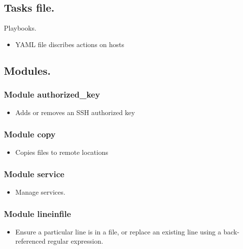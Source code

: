 \documentclass[16pt]{beamer}
\begin{document}
\subsection{Tasks file.}
\begin{frame}{Playbooks.}
  \begin{itemize}
  \item
  YAML file discribes actions on hosts
  \end{itemize}
  
\end{frame}


\subsection{Modules.}

\begin{frame}[fragile]
\frametitle{Module authorized\_key}
  \begin{itemize}
  \item
  Adds or removes an SSH authorized key
  \end{itemize}
  
\end{frame}

\begin{frame}[fragile]
\frametitle{Module copy}
  \begin{itemize}
  \item
  Copies files to remote locations
  \end{itemize}
  
\end{frame}


\begin{frame}[fragile]
\frametitle{Module service}
  \begin{itemize}
  \item
  Manage services.
  \end{itemize}
  
  
\end{frame}

\begin{frame}[fragile]
\frametitle{Module lineinfile}
  \begin{itemize}
  \item
  Ensure a particular line is in a file, or replace an existing line using a
  back-referenced regular expression.
  \end{itemize}
  
\end{frame}
\end{document}
